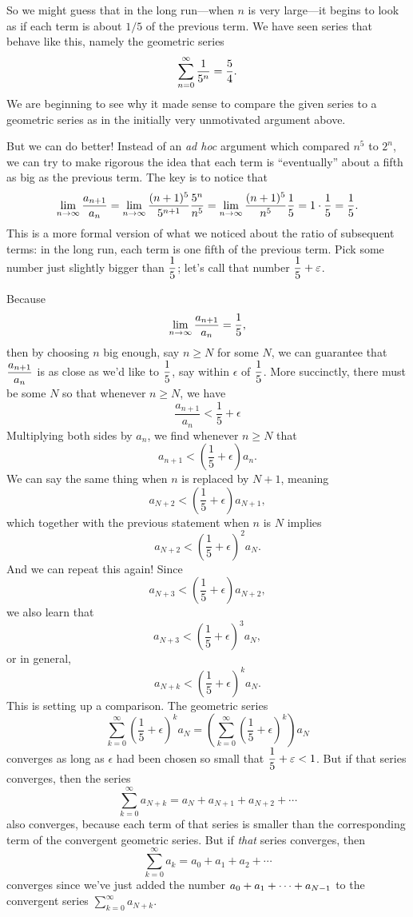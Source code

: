 So we might guess that in the long run---when $n$ is very large---it
begins to look as if each term is about $1/5$ of the previous term. We
have seen series that behave like this, namely the geometric series
$$\sum_{n=0}^\infty {1\over 5^n} = {5\over4}.$$
We are beginning to see why it made sense to compare the given series
to a geometric series as in the initially very unmotivated argument
above.

But we can do better!  Instead of an \textit{ad hoc} argument which
compared $n^5$ to $2^n$, we can try to make rigorous the idea that
each term is ``eventually'' about a fifth as big as the previous term.
The key is to notice that
$$
  \lim_{n\to\infty} {a_{n+1}\over a_n}=
  \lim_{n\to\infty} {(n+1)^5\over 5^{n+1}}{5^n\over n^5}=
  \lim_{n\to\infty} {(n+1)^5\over n^5}{1\over 5}=1\cdot {1\over5}
    ={1\over 5}.
$$ 
This is a more formal version of what we noticed about the ratio of
subsequent terms: in the long run, each term is one fifth of the
previous term.  Pick some number just slightly bigger than
$\displaystyle\frac{1}{5}$; let's call that number $\displaystyle\frac{1}{5} + \varepsilon$.


Because
$$\lim_{n\to\infty} {a_{n+1}\over a_n}={1\over5},$$
then by choosing $n$ big enough, say $n\ge N$ for some $N$, we can
guarantee that $\displaystyle\frac{a_{n+1}}{a_n}$ is as close as we'd like to
$\displaystyle\frac{1}{5}$, say within $\epsilon$ of $\displaystyle\frac{1}{5}$.  More
succinctly, there must be some $N$ so that whenever $n \geq N$, we
have
$$
\frac{a_{n+1}}{a_n} < \frac{1}{5} + \epsilon
$$
Multiplying both sides by $a_n$, we find whenever $n \geq N$ that
$$
a_{n+1} <  \left( \frac{1}{5} + \epsilon \right) a_n.
$$
We can say the same thing when $n$ is replaced by $N+1$, meaning
$$
a_{N+2} <  \left( \frac{1}{5} + \epsilon \right) a_{N+1},
$$
which together with the previous statement when $n$ is $N$ implies
$$
a_{N+2} <  \left( \frac{1}{5} + \epsilon \right)^2 a_N.
$$
And we can repeat this again!  Since
$$
a_{N+3} <  \left( \frac{1}{5} + \epsilon \right) a_{N+2},
$$
we also learn that
$$
a_{N+3} <  \left( \frac{1}{5} + \epsilon \right)^3 a_N,
$$
or in general,
$$
a_{N+k} <  \left( \frac{1}{5} + \epsilon \right)^k a_N.
$$
This is setting up a comparison.  The geometric series
$$
\sum_{k=0}^\infty \left( \frac{1}{5} + \epsilon \right)^k a_N = \left( \sum_{k=0}^\infty \left( \frac{1}{5} + \epsilon \right)^k \right) a_N
$$
converges as long as $\epsilon$ had been chosen so small that $\displaystyle\frac{1}{5} + \varepsilon < 1$.  But if that series converges, then the series 
$$
\sum_{k=0}^\infty a_{N+k} = a_N + a_{N+1} + a_{N+2} + \cdots
$$
also converges, because each term of that series is smaller than the corresponding term of the convergent geometric series.  But if \textit{that} series converges, then 
$$
\sum_{k=0}^\infty a_{k} = a_0 + a_{1} + a_{2} + \cdots
$$
converges since we've just added the number $\displaystyle a_0+a_1+\cdots+a_{N-1}$ to the convergent series $\sum_{k=0}^\infty a_{N+k}$.

